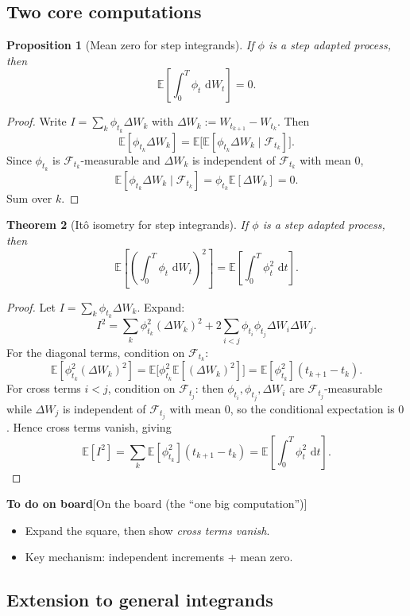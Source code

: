 \documentclass[11pt]{article}
\newcommand{\E}{\mathbb{E}}
\newcommand{\F}{\mathcal{F}}
\newcommand{\1}{\mathbf{1}}
\newcommand{\dd}{\,\mathrm{d}}
\numberwithin{equation}{section}
\theoremstyle{plain}
\newtheorem{theorem}{Theorem}[section]
\newtheorem{proposition}[theorem]{Proposition}
\theoremstyle{definition}
\theoremstyle{remark}
\begin{document}
\subsection{Two core computations}

\begin{proposition}[Mean zero for step integrands]
If $\phi$ is a step adapted process, then
\[
\E\!\left[\int_0^T \phi_t\,\dd W_t\right]=0.
\]
\end{proposition}

\begin{proof}
Write $I=\sum_{k}\phi_{t_k}\Delta W_k$ with $\Delta W_k:=W_{t_{k+1}}-W_{t_k}$.
Then
\[
\E[\phi_{t_k}\Delta W_k]=\E\!\big[\E[\phi_{t_k}\Delta W_k\mid \F_{t_k}]\big].
\]
Since $\phi_{t_k}$ is $\F_{t_k}$-measurable and $\Delta W_k$ is independent of $\F_{t_k}$ with mean $0$,
\[
\E[\phi_{t_k}\Delta W_k\mid \F_{t_k}]
=\phi_{t_k}\E[\Delta W_k]=0.
\]
Sum over $k$.
\end{proof}

\begin{theorem}[It\^o isometry for step integrands]
If $\phi$ is a step adapted process, then
\[
\E\!\left[\left(\int_0^T \phi_t\,\dd W_t\right)^2\right]
=\E\!\left[\int_0^T \phi_t^2\,\dd t\right].
\]
\end{theorem}

\begin{proof}
Let $I=\sum_k \phi_{t_k}\Delta W_k$.
Expand:
\[
I^2=\sum_k \phi_{t_k}^2(\Delta W_k)^2 + 2\sum_{i<j}\phi_{t_i}\phi_{t_j}\Delta W_i\Delta W_j.
\]
For the diagonal terms, condition on $\F_{t_k}$:
\[
\E[\phi_{t_k}^2(\Delta W_k)^2]
=\E\!\big[\phi_{t_k}^2\E[(\Delta W_k)^2]\big]
=\E[\phi_{t_k}^2](t_{k+1}-t_k).
\]
For cross terms $i<j$, condition on $\F_{t_j}$: then
$\phi_{t_i},\phi_{t_j},\Delta W_i$ are $\F_{t_j}$-measurable while
$\Delta W_j$ is independent of $\F_{t_j}$ with mean $0$, so the conditional expectation is $0$.
Hence cross terms vanish, giving
\[
\E[I^2]=\sum_k \E[\phi_{t_k}^2](t_{k+1}-t_k)=\E\!\left[\int_0^T \phi_t^2\,\dd t\right].
\]
\end{proof}

\textbf{To do on board}[On the board (the “one big computation”)]
\begin{itemize}[leftmargin=2em]
  \item Expand the square, then show \emph{cross terms vanish}.
  \item Key mechanism: independent increments + mean zero.
\end{itemize}


\subsection{Extension to general integrands}
\end{document}
